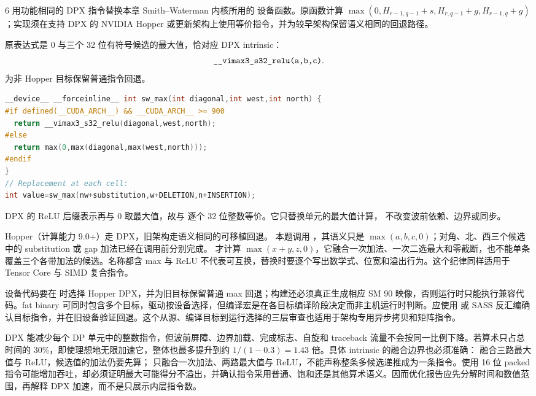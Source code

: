 \begin{solutionexercise}{6}
\problemheading 用功能相同的 DPX 指令替换本章 Smith--Waterman 内核所用的
 设备函数。原函数计算
$\max(0,H_{r-1,q-1}+s,H_{r,q-1}+g,H_{r-1,q}+g)$；实现须在支持 DPX 的 NVIDIA
Hopper 或更新架构上使用等价指令，并为较早架构保留语义相同的回退路径。

\approachheading 原表达式是 0 与三个 32 位有符号候选的最大值，恰对应 DPX intrinsic：
\[
\code{__vimax3_s32_relu(a,b,c)}.
\]
为非 Hopper 目标保留普通指令回退。

\answerheading
\begin{lstlisting}[language=C++]
__device__ __forceinline__ int sw_max(int diagonal,int west,int north) {
#if defined(__CUDA_ARCH__) && __CUDA_ARCH__ >= 900
  return __vimax3_s32_relu(diagonal,west,north);
#else
  return max(0,max(diagonal,max(west,north)));
#endif
}
// Replacement at each cell:
int value=sw_max(nw+substitution,w+DELETION,n+INSERTION);
\end{lstlisting}
DPX 的 ReLU 后缀表示再与 0 取最大值，故与
 逐个 32 位整数等价。它只替换单元的最大值计算，
不改变波前依赖、边界或同步。

\conclusionheading Hopper（计算能力 9.0+）走 DPX，旧架构走语义相同的可移植回退。
\discussionheading
{}本题调用 ，其语义只是 $\max(a,b,c,0)$；对角、北、西三个候选中的 substitution 或 gap 加法已经在调用前分别完成。 才计算 $\max(x+y,z,0)$，它融合一次加法、一次二选最大和零截断，也不能单条覆盖三个各带加法的候选。名称都含 max 与 ReLU 不代表可互换，替换时要逐个写出数学式、位宽和溢出行为。这个纪律同样适用于 Tensor Core 与 SIMD 复合指令。

设备代码要在  时选择 Hopper DPX，并为旧目标保留普通 max 回退；构建还必须真正生成相应 SM 90 映像，否则运行时只能执行兼容代码。fat binary 可同时包含多个目标，驱动按设备选择，但编译宏是在各目标编译阶段决定而非主机运行时判断。应使用  或 SASS 反汇编确认目标指令，并在旧设备验证回退。这个从源、编译目标到运行选择的三层审查也适用于架构专用异步拷贝和矩阵指令。

DPX 能减少每个 DP 单元中的整数指令，但波前屏障、边界加载、完成标志、自旋和 traceback 流量不会按同一比例下降。若算术只占总时间的 30\%，即使理想地无限加速它，整体也最多提升到约 $1/(1-0.3)=1.43$ 倍。具体 intrinsic 的融合边界也必须准确： 融合三路最大值与 ReLU，候选值的加法仍要先算； 只融合一次加法、两路最大值与 ReLU，不能声称整条多候选递推成为一条指令。使用 16 位 packed 指令可能增加吞吐，却必须证明最大可能得分不溢出，并确认指令采用普通、饱和还是其他算术语义。因而优化报告应先分解时间和数值范围，再解释 DPX 加速，而不是只展示内层指令数。


\end{solutionexercise}
